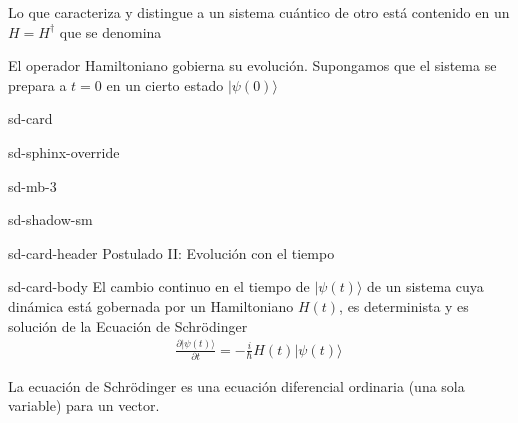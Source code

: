 \documentclass[letterpaper,10pt,english]{jupyterBook}
\newcommand{\ket}[1]{|#1\rangle}
\begin{document}
\sphinxAtStartPar
Lo que caracteriza y distingue a un sistema cuántico de otro está contenido en un  \(H = H^\dagger\) que se denomina 

\sphinxAtStartPar
El operador Hamiltoniano  gobierna su evolución. Supongamos que el sistema se prepara a \(t=0\) en un cierto estado \(\ket{\psi(0)}\)

\begin{sphinxuseclass}{sd-card}
\begin{sphinxuseclass}{sd-sphinx-override}
\begin{sphinxuseclass}{sd-mb-3}
\begin{sphinxuseclass}{sd-shadow-sm}
\begin{sphinxuseclass}{sd-card-header}
\sphinxAtStartPar
Postulado  II: Evolución con el tiempo

\end{sphinxuseclass}
\begin{sphinxuseclass}{sd-card-body}
\sphinxAtStartPar
El cambio continuo en el tiempo de  \(\ket{\psi(t)}\) de un sistema cuya dinámica está gobernada por un Hamiltoniano \(H(t)\),  es determinista y es solución de la Ecuación de Schrödinger
\begin{equation*}
\begin{split}
 \frac{\partial\ket{\psi(t)}}{\partial t} =-\frac{i}{\hbar} H(t) \ket{\psi(t)} \, \label{eqschr}
\end{split}
\end{equation*}
\end{sphinxuseclass}
\end{sphinxuseclass}
\end{sphinxuseclass}
\end{sphinxuseclass}
\end{sphinxuseclass}
\sphinxAtStartPar
La ecuación de Schrödinger es una ecuación diferencial ordinaria (una sola variable) para un vector.
\end{document}
